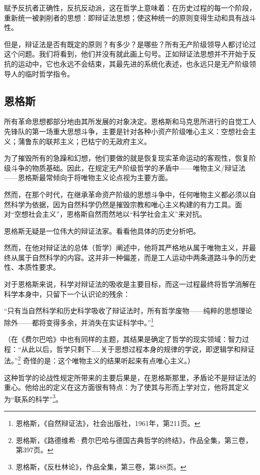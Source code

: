 \documentclass[fontset=fandol, a4paper, 12pt, twoside]{ctexart}
\renewenvironment{quote}
  {\list{}{\rightmargin=0cm \leftmargin=2em}%
   \item\relax\small\kaishu\color{black}}
  {\endlist}
\begin{document}
赋予反抗者正确性，反抗反动派，这在哲学上意味着：在历史过程的每一个阶段，重新统一被剥削者的思想：即辩证法思想；使这种统一的原则变得生动和具有战斗性。

但是，辩证法是否有既定的原则？有多少？是哪些？所有无产阶级领导人都讨论过这个问题。我们将看到，他们并没有就此画上句号。正如辩证法思想并不开始于反抗的运动中，它也永远不会结束，其最先进的系统化表述，也永远只是无产阶级领导人的临时哲学指令。

\subsection{恩格斯}

所有革命思想都部分地由其所发展的对象决定。恩格斯和马克思所进行的自觉工人先锋队的第一场重大思想斗争，主要是针对各种小资产阶级唯心主义：空想社会主义；蒲鲁东的联邦主义；巴枯宁的无政府主义。

为了摧毁所有的急躁和幻想，他们要做的就是恢复现实革命运动的客观性，恢复阶级斗争的物质基础。因此，在规定无产阶级哲学的矛盾中——唯物主义/辩证法——恩格斯最常倾向于将唯物主义论点视为主要方面。

然而，在那个时代，在继承革命资产阶级的思想斗争中，任何唯物主义都必须以自然科学为依据，因为自然科学仍然是摧毁宗教和唯心主义构建的有力工具。面对“空想社会主义”，恩格斯自然而然地以“科学社会主义”来对抗。

恩格斯无疑是一位伟大的辩证法家。看看他具体的历史分析吧。

然而，在他对辩证法的总体（哲学）阐述中，他将其严格地从属于唯物主义，并最终从属于自然科学的内容。这并非一种偏差，而是工人运动中两条道路斗争的历史性、本质性要求。

对于恩格斯来说，科学对辩证法的吸收是主要目标，而这一过程最终将哲学消解在科学本身中，只留下一个认识论的残余：

\begin{quote}
“只有当自然科学和历史科学吸收了辩证法时，所有哲学废物——纯粹的思想理论除外——都将变得多余，并消失在实证科学中。”\footnote{恩格斯，《自然辩证法》，社会出版社，1961年，第211页。}
\end{quote}

（在《费尔巴哈》中也有同样的主题，其结果是确定了哲学的现实领域：智力过程：“从此以后，哲学只剩下……关于思想过程本身的规律的学说，即逻辑学和辩证法。”\footnote{恩格斯，《路德维希·费尔巴哈与德国古典哲学的终结》，作品全集，第三卷，第397页。} 奇怪的是：这个唯物主义的结果听起来有点唯心主义。）

这种哲学的论战性规定所带来的主要后果是，在恩格斯那里，矛盾论不是辩证法的重心。他给出的定义在这方面很有特点：为了使其与形而上学对立，他将其定义为“联系的科学”\footnote{恩格斯，《反杜林论》，作品全集，第三卷，第488页。}。
\end{document}
